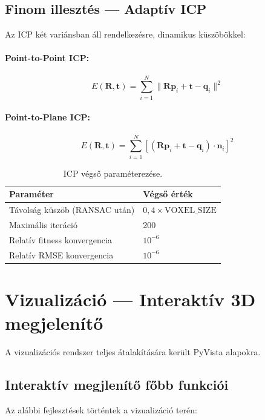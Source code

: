 \documentclass[12pt,a4paper]{article}
\begin{document}
\subsection{Finom illesztés — Adaptív ICP}

Az ICP két variánsban áll rendelkezésre, dinamikus küszöbökkel:

\paragraph{Point-to-Point ICP:}
\[
E(\mathbf{R}, \mathbf{t}) = \sum_{i=1}^{N} \| \mathbf{R} \mathbf{p}_i + \mathbf{t} - \mathbf{q}_i \|^2
\]

\paragraph{Point-to-Plane ICP:}
\[
E(\mathbf{R}, \mathbf{t}) = \sum_{i=1}^{N} \left[ (\mathbf{R} \mathbf{p}_i + \mathbf{t} - \mathbf{q}_i) \cdot \mathbf{n}_i \right]^2
\]

\begin{table}[H]
\centering
\begin{tabular}{ll}
\toprule
\textbf{Paraméter} & \textbf{Végső érték} \\
\midrule
Távolság küszöb (RANSAC után) & $0{,}4 \times \text{VOXEL\_SIZE}$ \\
Maximális iteráció & 200 \\
Relatív fitness konvergencia & $10^{-6}$ \\
Relatív RMSE konvergencia & $10^{-6}$ \\
\bottomrule
\end{tabular}
\caption{ICP végső paraméterezése.}
\end{table}

\section{Vizualizáció — Interaktív 3D megjelenítő}

A vizualizációs rendszer teljes átalakítására került PyVista alapokra.

\subsection{Interaktív megjlenítő főbb funkciói}

Az alábbi fejlesztések történtek a vizualizáció terén:
\end{document}
